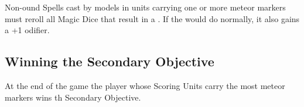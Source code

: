 Non-ound Spells cast by models in units carrying one or more meteor markers must reroll all Magic Dice that result in a . If the  would do  normally, it also gains a +1 odifier.

\subsection*{Winning the Secondary Objective}

At the end of the game\rewordedrule{,} the player whose Scoring Units carry the most meteor markers wins th Secondary Objective. 
